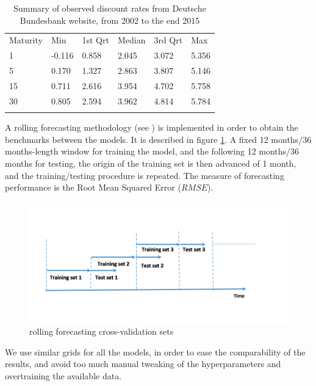 \begin{table}[!htb]
\begin{center}
\caption{Summary of observed discount rates from Deutsche Bundesbank website, from 2002 to the end 2015}
\label{tab:summary_db_zeros}       %
\begin{tabular}{llllll}
\hline\noalign{\smallskip}
Maturity & Min & 1st Qrt  & Median  & 3rd Qrt  & Max  \\
\noalign{\smallskip}\hline\noalign{\smallskip}
  1 & -0.116 & 0.858 & 2.045 & 3.072 & 5.356 \\
  5 & 0.170 & 1.327 & 2.863 & 3.807 & 5.146\\
  15 & 0.711 & 2.616 & 3.954 & 4.702 & 5.758\\
  30 & 0.805 & 2.594 & 3.962 & 4.814 & 5.784\\
\noalign{\smallskip}\hline
\end{tabular}
\end{center}
\end{table}

A rolling forecasting methodology (see \cite{bergmeir2015note}) is implemented in order to obtain the benchmarks between the models. It is described in figure \ref{rolling_cv}. A fixed 12 months/36 months-length window for training the model, and the following 12 months/36 months for testing, the origin of the training set is then advanced of 1 month, and the training/testing procedure is repeated. The measure of forecasting performance is the Root Mean Squared Error ($RMSE$).

\begin{figure}[!htb]
\centering
\includegraphics[width=13.5cm]{gfx/chapter-krls-models/rolling_cv}
\caption{rolling forecasting cross-validation sets}
\label{rolling_cv}
\end{figure}


We use similar grids for all the models, in order to ease the comparability of the results, and avoid too much manual tweaking of the hyperparameters and overtraining the available data. 

